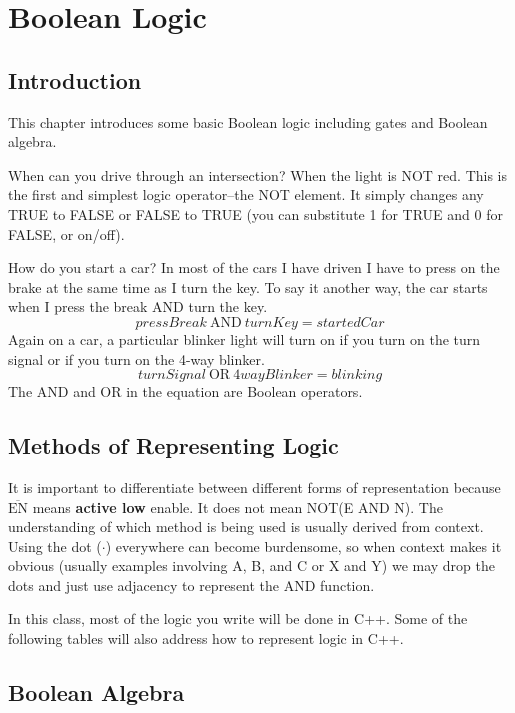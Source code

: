 \chapter{Boolean Logic}

\section{Introduction}
This chapter introduces some basic Boolean logic including gates and Boolean algebra.

When can you drive through an intersection? When the light is NOT red. This is the first and simplest
logic operator--the NOT element. It simply changes any TRUE to FALSE or FALSE to TRUE (you can substitute
1 for TRUE and 0 for FALSE, or on/off).

How do you start a car? In most of the cars I have driven I have to press on the brake at the 
same time as I turn the key. To say it another way, the car starts when I press the break
AND turn the key.
\begin{equation}
	pressBreak \: \mathrm{AND} \: turnKey = startedCar
\end{equation}
Again on a car, a particular blinker light will turn on if you turn on the turn signal or if you turn on the 4-way blinker.
\begin{equation}
	turnSignal \: \mathrm{OR} \: 4wayBlinker = blinking
\end{equation}
The AND and OR in the equation are Boolean operators. 

\section{Methods of Representing Logic}
It is important to differentiate between different forms of representation because $\overline{\mathrm{EN}}$
means \textbf{active low} enable. It does not mean NOT(E AND N). The understanding of which method is being 
used is usually derived from context. Using the dot ($\cdot$) everywhere can become burdensome, so when context
makes it obvious (usually examples involving A, B, and C or X and Y) we may drop the dots and just use adjacency to represent
the AND function.

In this class, most of the logic you write will be done in C++. Some of the following tables will also
address how to represent logic in C++.

\section{Boolean Algebra}

